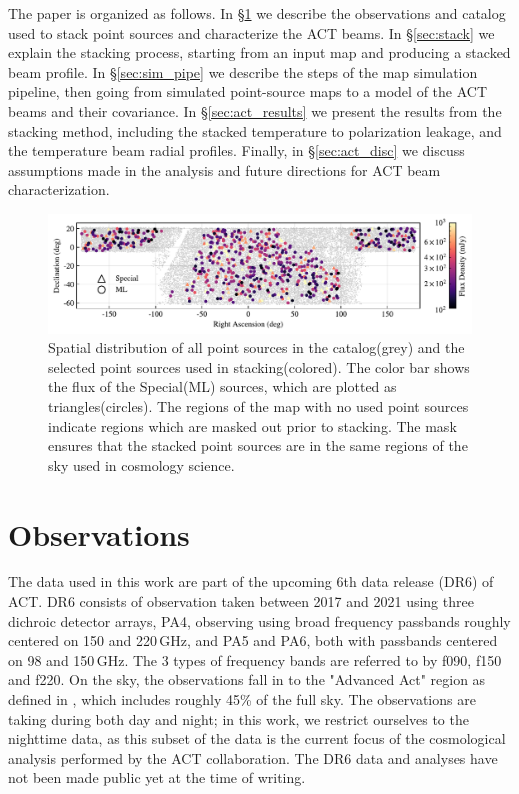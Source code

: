 The paper is organized as follows.  In \S\ref{sec:observations} we describe the observations and catalog used to stack point sources and characterize the ACT beams.  In \S\ref{sec:stack} we explain the stacking process, starting from an input map and producing a stacked beam profile.  In \S\ref{sec:sim_pipe} we describe the steps of the map simulation pipeline, then going from simulated point-source maps to a model of the ACT beams and their covariance.  In \S\ref{sec:act_results} we present the results from the stacking method, including the stacked temperature to polarization leakage, and the temperature beam radial profiles.  Finally, in \S\ref{sec:act_disc} we discuss assumptions made in the analysis and future directions for ACT beam characterization.

\begin{figure}[t]
    \centering
    \includegraphics[width = \textwidth]{Figures/flux_map.pdf}
    \caption{Spatial distribution of all point sources in the catalog(grey) and the selected point sources used in stacking(colored).  The color bar shows the flux of the Special(ML) sources, which are plotted as triangles(circles).  The regions of the map with no used point sources indicate regions which are masked out prior to stacking.  The mask ensures that the stacked point sources are in the same regions of the sky used in cosmology science.}
    \label{fig:ptsrc_map}
\end{figure}

\section{Observations}
\label{sec:observations}
The  data used in this work are part of the upcoming 6th data release (DR6) of ACT. DR6 consists of observation taken between 2017 and 2021 using three dichroic detector arrays, PA4, observing using broad frequency passbands roughly centered on  150 and 220\,GHz, and PA5 and PA6, both with passbands centered on 98 and 150\,GHz. The 3 types of frequency bands are referred to by f090, f150 and f220. On the sky, the observations fall in to the "Advanced Act" region as defined in \cite{aiola_2020}, which includes roughly 45\% of the full sky. The observations are taking during both day and night; in this work, we restrict ourselves to the nighttime data, as this subset of the data is the current focus of the cosmological analysis performed by the ACT collaboration. The DR6 data and analyses have not been made public yet at the time of writing.

